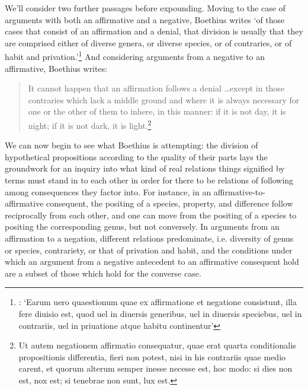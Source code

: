 \documentclass[a4paper, 11pt]{article}
\begin{document}
We'll consider two further passages before expounding. Moving to the case of arguments with both an affirmative and a negative, Boethius writes `of those cases that consist of an affirmation and a denial, that division is usually that they are comprised either of diverse genera, or diverse species, or of contraries, or of habit and privation.'\footnote{\autocite[1179D]{BDT}: `Earum uero quaestionum quae ex affirmatione et negatione consistunt, illa fere diuisio est, quod uel in diuersis generibus, uel in diuersis speciebus, uel in contrariis, uel in priuatione atque habitu continentur'} And considering arguments from a negative to an affirmative, Boethius writes: 
\begin{quote}
It cannot happen that an affirmation follows a denial \ldots except in those contraries which lack a middle ground and where it is always necessary for one or the other of them to inhere, in this manner: if it is not day, it is night; if it is not dark, it is light.\footnote{\autocite[1180A]{BDT} Ut autem negationem affirmatio consequatur, quae erat quarta conditionalis propositionis differentia, fieri non potest, nisi in his contrariis quae medio carent, et quorum alterum semper inesse necesse est, hoc modo: si dies non est, nox est; si tenebrae non sunt, lux est.} 
\end{quote}

We can now begin to see what Boethius is attempting: the division of hypothetical propositions according to the quality of their parts lays the groundwork for an inquiry into what kind of real relations things signified by terms must stand in to each other in order for there to be relations of following among consequences they factor into. For instance, in an affirmative-to-affirmative consequent, the positing of a species, property, and difference follow reciprocally from each other, and one can move from the positing of a species to positing the corresponding genus, but not conversely. In arguments from an affirmation to a negation, different relations predominate, i.e.  diversity of genus or species, contrariety, or that of privation and habit, and the conditions under which an argument from a negative antecedent to an affirmative consequent hold are a subset of those which hold for the converse case.
\end{document}
